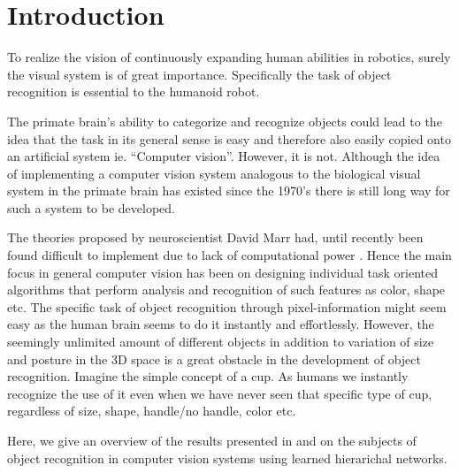 \section{Introduction}
\label{sec:introduction}
To realize the vision of continuously expanding human abilities in robotics,
surely the visual system is of great importance.
Specifically the task of object recognition is essential to the humanoid robot.

The primate brain's ability to categorize and recognize objects could lead to
the idea that the task in its general sense is easy and therefore also easily
copied onto an artificial system ie. “Computer vision”. However, it is not.
Although the idea of implementing a computer vision system analogous to
the biological visual system in the primate brain has existed since the 1970's
there is still long way for such a system to be developed.

The theories proposed by neuroscientist David Marr had,
until recently been found difficult to implement due to lack of computational power \citep{kruger2013deep}.
Hence the main focus in general computer vision has been on designing individual
task oriented algorithms that perform analysis and recognition of such features as color, shape etc.
The specific task of object recognition through pixel-information might seem
easy as the human brain seems to do it instantly and effortlessly.
However, the seemingly unlimited amount of different objects in addition to variation of size
and posture in the 3D space is a great obstacle in the development of object recognition.
Imagine the simple concept of a cup. As humans we instantly recognize the use of it
even when we have never seen that specific type of cup,
regardless of size, shape, handle/no handle, color etc.

Here, we give an overview of the results presented in \citet{kruger2013deep} and \citet{fidler2009learning}
on the subjects of object recognition in computer vision systems using learned hierarichal networks.
